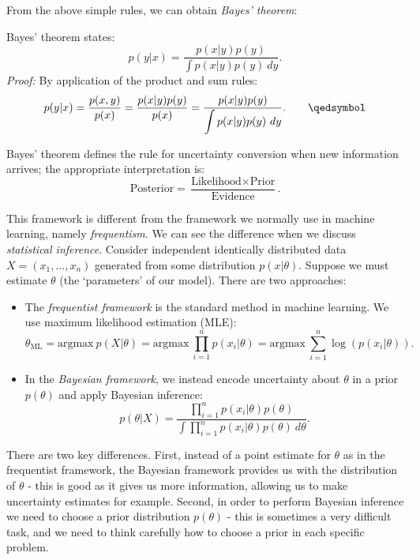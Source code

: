 \newpage
From the above simple rules, we can obtain \textit{Bayes' theorem}:
\begin{framethm}
Bayes' theorem states:
\begin{equation*}
p(y|x) = \frac{p(x|y) p(y)}{\displaystyle \int p(x|y) p(y)\ dy}.
\end{equation*}
\noindent \textit{Proof:} By application of the product and sum rules:
\begin{equation*}
p(y|x) = \frac{p(x,y)}{p(x)} = \frac{p(x|y)p(y)}{p(x)} = \frac{p(x|y) p(y)}{\displaystyle \int p(x|y) p(y)\ dy}. \qquad \qedsymbol
\end{equation*}
\end{framethm}

Bayes' theorem defines the rule for uncertainty conversion when new information arrives; the appropriate interpretation is:
\begin{equation*}
\text{Posterior} = \frac{\text{Likelihood} \times \text{Prior}}{\text{Evidence}}.
\end{equation*}

This framework is different from the framework we normally use in machine learning, namely \textit{frequentism}. We can see the difference when we discuss \textit{statistical inference}. Consider independent identically distributed data $X = (x_1,...,x_n)$ generated from some distribution $p(x|\theta)$. Suppose we must estimate $\theta$ (the `parameters' of our model). There are two approaches:
\begin{itemize}
\item The \textit{frequentist framework} is the standard method in machine learning. We use maximum likelihood estimation (MLE):
\begin{equation*}
\theta_{\text{ML}} = \textrm{argmax}\ p(X|\theta) = \textrm{argmax}\ \prod_{i=1}^{n} p(x_i|\theta) = \textrm{argmax}\ \sum_{i=1}^{n} \log\left( p(x_i | \theta) \right).
\end{equation*}
\item In the \textit{Bayesian framework}, we instead encode uncertainty about $\theta$ in a prior $p(\theta)$ and apply Bayesian inference:
\begin{equation*}
p(\theta | X) = \frac{\displaystyle \prod_{i=1}^{n} p(x_i | \theta) p(\theta) }{\displaystyle \int \prod_{i=1}^{n} p(x_i | \theta) p(\theta)\ d\theta}.
\end{equation*}
\end{itemize}
There are two key differences. First, instead of a point estimate for $\theta$ as in the frequentist framework, the Bayesian framework provides us with the distribution of $\theta$ - this is good as it gives us more information, allowing us to make uncertainty estimates for example. Second, in order to perform Bayesian inference we need to choose a prior distribution $p(\theta)$ - this is sometimes a very difficult task, and we need to think carefully how to choose a prior in each specific problem.



